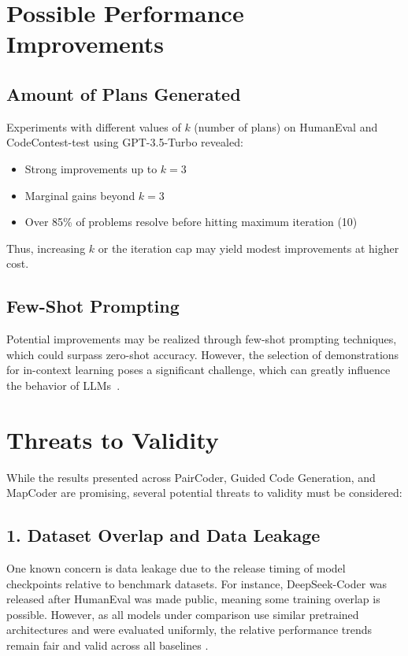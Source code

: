 \documentclass[11pt,a4paper]{article}
\begin{document}
\section{Possible Performance Improvements}

\subsection{Amount of Plans Generated}
Experiments with different values of $k$ (number of plans) on HumanEval and CodeContest-test using GPT-3.5-Turbo revealed:

\begin{itemize}
  \item Strong improvements up to $k = 3$
  \item Marginal gains beyond $k = 3$
  \item Over 85\% of problems resolve before hitting maximum iteration (10)
\end{itemize}

Thus, increasing $k$ or the iteration cap may yield modest improvements at higher cost.

\subsection{Few-Shot Prompting}
Potential improvements may be realized through few-shot prompting techniques, which could surpass zero-shot accuracy. However, the selection of demonstrations for in-context learning poses a significant challenge, which can greatly influence the behavior of LLMs~\cite{islam2024mapcodermultiagentcodegeneration}.

\section{Threats to Validity}

While the results presented across PairCoder, Guided Code Generation, and MapCoder are promising, several potential threats to validity must be considered:

\subsection*{1. Dataset Overlap and Data Leakage}
One known concern is data leakage due to the release timing of model checkpoints relative to benchmark datasets. For instance, DeepSeek-Coder was released after HumanEval was made public, meaning some training overlap is possible. However, as all models under comparison use similar pretrained architectures and were evaluated uniformly, the relative performance trends remain fair and valid across all baselines \cite{zhang2024paircoder}.
\end{document}
